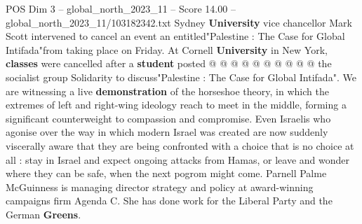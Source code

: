 \begin{textsample}{POS Dim 3 – global\_north\_2023\_11 – Score 14.00 – global\_north\_2023\_11/103182342.txt}
Sydney \textbf{University} vice chancellor Mark Scott intervened to cancel an event an entitled"Palestine : The Case for Global Intifada"from taking place on Friday.
At Cornell \textbf{University} in New York, \textbf{classes} were cancelled after a \textbf{student} posted @ @ @ @ @ @ @ @ @ @ the socialist group Solidarity to discuss"Palestine : The Case for Global Intifada".
We are witnessing a live \textbf{demonstration} of the horseshoe theory, in which the extremes of left and right-wing ideology reach to meet in the middle, forming a significant counterweight to compassion and compromise.
Even Israelis who agonise over the way in which modern Israel was created are now suddenly viscerally aware that they are being confronted with a choice that is no choice at all : stay in Israel and expect ongoing attacks from Hamas, or leave and wonder where they can be safe, when the next pogrom might come.
Parnell Palme McGuinness is managing director strategy and policy at award-winning campaigns firm Agenda C.
She has done work for the Liberal Party and the German \textbf{Greens}.

\end{textsample}
